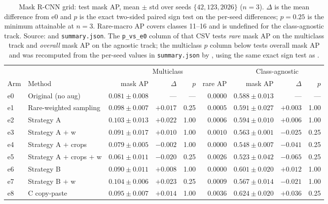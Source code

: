 \begin{table}[H]
\centering
\caption{Mask R-CNN grid: test mask AP, mean $\pm$ std over seeds
$\{42,123,2026\}$ ($n=3$). $\Delta$ is the mean difference from e0 and $p$ is the
exact two-sided paired sign test on the per-seed differences; $p=0.25$ is the
minimum attainable at $n=3$. Rare-macro AP covers classes 11--16 and is undefined
for the class-agnostic track. Source:
\protect{} and \texttt{summary.json}. The
\texttt{p\_vs\_e0} column of that CSV tests \emph{rare} mask AP on the multiclass
track and \emph{overall} mask AP on the agnostic track; the multiclass $p$ column
below tests overall mask AP and was recomputed from the per-seed values in
\texttt{summary.json} by \protect{}, using the
same exact sign test as \protect{}.}
\label{tab:grid}
\small
\begin{tabular}{@{}ll rrr r rr r@{}}
\toprule
& & \multicolumn{4}{c}{Multiclass} & \multicolumn{3}{c}{Class-agnostic} \\
\cmidrule(lr){3-6}\cmidrule(lr){7-9}
Arm & Method & mask AP & $\Delta$ & $p$ & rare AP & mask AP & $\Delta$ & $p$ \\
\midrule
e0  & Original (no aug)        & $0.081 \pm 0.008$ & ---      & ---  & $0.0000$ & $0.588 \pm 0.013$ & ---      & ---  \\
e1  & Rare-weighted sampling   & $0.098 \pm 0.007$ & $+0.017$ & 0.25 & $0.0005$ & $0.591 \pm 0.027$ & $+0.003$ & 1.00 \\
e2  & Strategy A               & $0.103 \pm 0.013$ & $+0.022$ & 1.00 & $0.0006$ & $0.594 \pm 0.010$ & $+0.006$ & 1.00 \\
e3  & Strategy A $+$ w         & $0.091 \pm 0.017$ & $+0.010$ & 1.00 & $0.0010$ & $0.563 \pm 0.001$ & $-0.025$ & 0.25 \\
e4  & Strategy A $+$ crops     & $0.079 \pm 0.005$ & $-0.002$ & 1.00 & $0.0000$ & $0.548 \pm 0.007$ & $-0.041$ & 0.25 \\
e5  & Strategy A $+$ crops $+$ w & $0.061 \pm 0.011$ & $-0.020$ & 0.25 & $0.0026$ & $0.523 \pm 0.042$ & $-0.065$ & 0.25 \\
e6  & Strategy B               & $0.090 \pm 0.011$ & $+0.008$ & 1.00 & $0.0000$ & $0.601 \pm 0.020$ & $+0.012$ & 1.00 \\
e7  & Strategy B $+$ w         & $0.104 \pm 0.006$ & $+0.023$ & 0.25 & $0.0009$ & $0.567 \pm 0.014$ & $-0.021$ & 1.00 \\
e8  & C copy-paste             & $0.095 \pm 0.007$ & $+0.014$ & 1.00 & $0.0036$ & $\mathbf{0.624 \pm 0.020}$ & $+0.036$ & 0.25 \\

\end{tabular}
\end{table}
